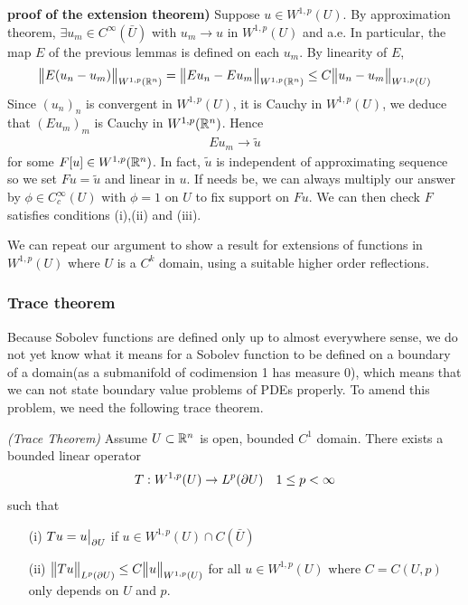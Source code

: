 \documentclass[10pt,a4paper]{report}
\newenvironment{proof}
{\begin{changemargin}{1cm}{0.5cm} 
	}%
	{\end{changemargin}
}
\begin{document}
\begin{proof}
\textbf{proof of the extension theorem) }  Suppose $u \in W^{1,p}(U)$. By approximation theorem, $\exists u_m \in C^{\infty}(\bar{U})$ with $u_m \rightarrow u$ in $W^{1,p}(U)$ and a.e. In particular, the map $E$ of the previous lemmas is defined on each $u_m$. By linearity of $E$,
\begin{align*}
\bigl\lVert E(u_n - u_m)\bigr\rVert_{W^{1,p}(\mathbb{R}^n)} = \bigl\lVert Eu_n - E u_m\bigr\rVert_{W^{1,p}(\mathbb{R}^n)} \leq C\bigl\lVert u_n - u_m\bigr\rVert_{W^{1,p}(U)}
\end{align*}
Since $(u_n)_n$ is convergent in $W^{1,p}(U)$, it is Cauchy in $W^{1,p}(U)$, we deduce that $(Eu_m)_m$ is Cauchy in $W^{1,p}(\mathbb{R}^n)$. Hence
\begin{align*}
E u_m \rightarrow \tilde{u}
\end{align*}
for some $F[u] \in W^{1,p}(\mathbb{R}^n)$. In fact, $\tilde{u}$ is independent of approximating sequence so we set $Fu = \tilde{u}$ and linear in $u$. If needs be, we can always multiply our answer by $\phi \in C_c^{\infty}(U)$ with $\phi =1$ on $U$ to fix support on $Fu$. We can then check $F$ satisfies conditions (i),(ii) and (iii).

\eop
\end{proof}
\s

We can repeat our argument to show a result for extensions of functions in $W^{1,p}(U)$ where $U$ is a $C^k$ domain, using a suitable higher order reflections.
\s

\subsubsection*{Trace theorem}

Because Sobolev functions are defined only up to almost everywhere sense, we do not yet know what it means for a Sobolev function to be defined on a boundary of a domain(as a submanifold of codimension 1 has measure 0), which means that we can not state boundary value problems of PDEs properly. To amend this problem, we need the following trace theorem.
\s

\thm \emph{(Trace Theorem)} Assume $U\subset \mathbb{R}^n$ is open, bounded $C^1$ domain. There exists a bounded linear operator
\begin{align*}
T : W^{1,p}(U) \rightarrow L^p(\partial U) \quad 1\leq p <\infty
\end{align*}
such that
\begin{itemize}
\item[(i)] $Tu = u \big|_{\partial U}$ if $u \in W^{1,p}(U) \cap C(\bar{U})$
\item[(ii)] $\bigl\lVert Tu\bigr\rVert_{L^p(\partial U)} \leq C\bigl\lVert u\bigr\rVert_{W^{1,p}(U)}$ for all $u\in W^{1,p}(U)$ where $C = C(U,p)$ only depends on $U$ and $p$.
\end{itemize}
\s
\end{document}
